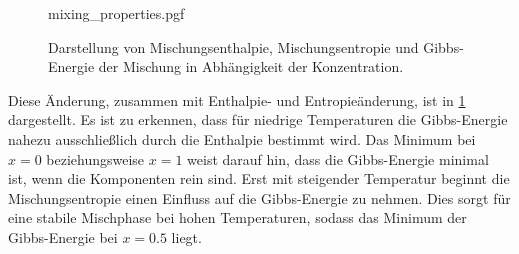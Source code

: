 \begin{figure}
    \centering
    {mixing_properties.pgf}
    \caption{Darstellung von Mischungsenthalpie, Mischungsentropie und Gibbs-Energie der Mischung in Abhängigkeit der
    Konzentration.
    }
    \label{fig:mixing_properties}
\end{figure}

Diese Änderung, zusammen mit Enthalpie- und Entropieänderung, ist in \cref{fig:mixing_properties} dargestellt.
Es ist zu erkennen, dass für niedrige Temperaturen die Gibbs-Energie nahezu ausschließlich durch die Enthalpie bestimmt
wird.
Das Minimum bei $x=0$ beziehungsweise $x=1$ weist darauf hin, dass die Gibbs-Energie minimal ist, wenn die
Komponenten rein sind.
Erst mit steigender Temperatur beginnt die Mischungsentropie einen Einfluss auf die Gibbs-Energie zu nehmen.
Dies sorgt für eine stabile Mischphase bei hohen Temperaturen, sodass das Minimum der Gibbs-Energie bei $x=0.5$ liegt.